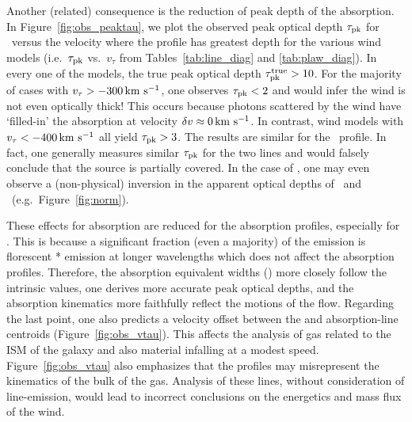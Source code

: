 \documentclass[12pt,preprint]{aastex}
\begin{document}
Another (related) consequence is the reduction of peak depth of the
absorption.
In Figure~\ref{fig:obs_peaktau}, we plot the observed peak optical depth
$\tau_{\rm pk}$ for \mgiia\ 
versus the velocity where the profile has greatest depth 
for the various wind models (i.e.\
$\tau_{\rm pk}$ vs.\ $v_\tau$ from Tables~\ref{tab:line_diag} and
\ref{tab:plaw_diag}).   In every one of the models, the true peak
optical depth $\tau_{\rm pk}^{\rm true} > 10$.  For the
majority of cases with $v_\tau > -300\, {\rm km~s^{-1}}$, one observes $\tau_{\rm pk} <
2$ and would infer the wind is not even optically thick!
This occurs because photons scattered by the wind have `filled-in' the
absorption at velocity $\delta v \approx 0 \, {\rm km~s^{-1}}$.  In contrast, wind
models with $v_\tau < -400 \, {\rm km~s^{-1}}$ all yield $\tau_{\rm pk} > 3$.  The
results are similar for the \mgiib\ profile.  In fact, one generally
measures similar $\tau_{\rm pk}$ for the two \ion{Mg}{2} lines and would 
falsely conclude that the source is partially covered. 
In the case of \ion{Fe}{2}, one may even observe a (non-physical)
inversion in the apparent optical depths of \feiia\ and \feiib\ (e.g.\
Figure~\ref{fig:norm}). 

These effects for \ion{Mg}{2} absorption are reduced
for the  absorption profiles, especially for \feiia.  This
is because a significant fraction (even a majority) of the
 emission is florescent \ion{Fe}{2}* emission at longer
wavelengths which does not affect the absorption profiles. 
Therefore, the \ion{Fe}{2} absorption equivalent widths (\ewabs) more
closely follow the intrinsic values, one derives more accurate peak
optical depths, and the absorption kinematics more faithfully reflect
the motions of the flow.  Regarding the last point, one also
predicts a velocity offset between the \ion{Fe}{2} and \ion{Mg}{2}
absorption-line centroids (Figure~\ref{fig:obs_vtau}).
This affects the analysis of gas related to the ISM of the galaxy and
also material infalling at a modest speed.  
Figure~\ref{fig:obs_vtau} also emphasizes that
the \ion{Mg}{2} profiles may misrepresent the kinematics of the bulk of
the gas.  Analysis of these lines, without consideration of
line-emission, would lead to incorrect conclusions on the energetics
and mass flux of the wind.
\end{document}
